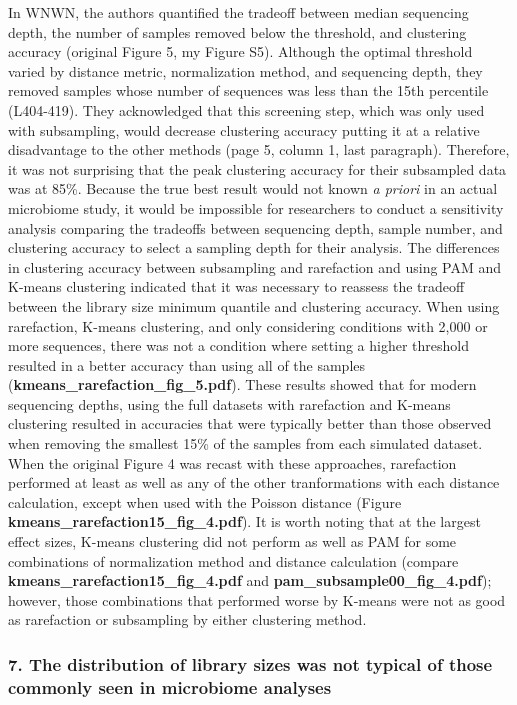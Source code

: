 \documentclass[
]{article}
\begin{document}
In WNWN, the authors quantified the tradeoff between median sequencing
depth, the number of samples removed below the threshold, and clustering
accuracy (original Figure 5, my Figure S5). Although the optimal
threshold varied by distance metric, normalization method, and
sequencing depth, they removed samples whose number of sequences was
less than the 15th percentile (L404-419). They acknowledged that this
screening step, which was only used with subsampling, would decrease
clustering accuracy putting it at a relative disadvantage to the other
methods (page 5, column 1, last paragraph). Therefore, it was not
surprising that the peak clustering accuracy for their subsampled data
was at 85\%. Because the true best result would not known \emph{a
priori} in an actual microbiome study, it would be impossible for
researchers to conduct a sensitivity analysis comparing the tradeoffs
between sequencing depth, sample number, and clustering accuracy to
select a sampling depth for their analysis. The differences in
clustering accuracy between subsampling and rarefaction and using PAM
and K-means clustering indicated that it was necessary to reassess the
tradeoff between the library size minimum quantile and clustering
accuracy. When using rarefaction, K-means clustering, and only
considering conditions with 2,000 or more sequences, there was not a
condition where setting a higher threshold resulted in a better accuracy
than using all of the samples
(\textbf{kmeans\_rarefaction\_fig\_5.pdf}). These results showed that
for modern sequencing depths, using the full datasets with rarefaction
and K-means clustering resulted in accuracies that were typically better
than those observed when removing the smallest 15\% of the samples from
each simulated dataset. When the original Figure 4 was recast with these
approaches, rarefaction performed at least as well as any of the other
tranformations with each distance calculation, except when used with the
Poisson distance (Figure \textbf{kmeans\_rarefaction15\_fig\_4.pdf}). It
is worth noting that at the largest effect sizes, K-means clustering did
not perform as well as PAM for some combinations of normalization method
and distance calculation (compare
\textbf{kmeans\_rarefaction15\_fig\_4.pdf} and
\textbf{pam\_subsample00\_fig\_4.pdf}); however, those combinations that
performed worse by K-means were not as good as rarefaction or
subsampling by either clustering method.

\hypertarget{the-distribution-of-library-sizes-was-not-typical-of-those-commonly-seen-in-microbiome-analyses}{%
\subsubsection{7. The distribution of library sizes was not typical of
those commonly seen in microbiome
analyses}\label{the-distribution-of-library-sizes-was-not-typical-of-those-commonly-seen-in-microbiome-analyses}}
\end{document}
